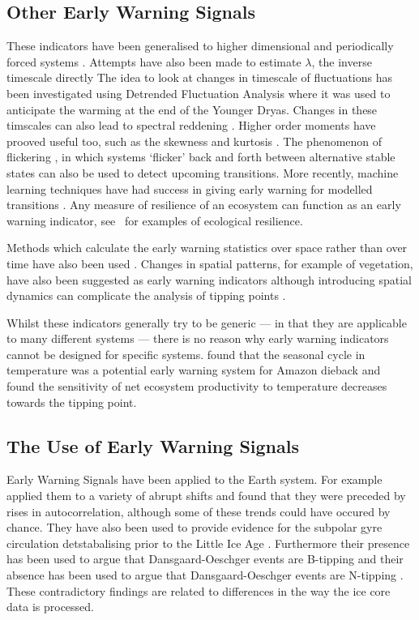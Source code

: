 \subsection{Other Early Warning Signals}
These indicators have been generalised to higher dimensional and periodically forced systems \parencite{Williamson2015,Williamson2016}. Attempts have also been made to estimate
$\lambda$, the inverse timescale directly \parencite{Boettner2022,Boers2021a} The idea to look at
changes in timescale of fluctuations has been investigated using Detrended Fluctuation Analysis \parencite{Livina2007} where it was used to anticipate the warming at the
end of the Younger Dryas. Changes in these timscales can also lead to spectral reddening \parencite{Kleinen2003}. Higher order moments have prooved useful too, such as the
skewness \parencite{Guttal2008} and kurtosis \parencite{Xie2019}. The phenomenon of flickering \parencite{Wang2012}, in which systems `flicker' back and forth between alternative stable
states can also be used to detect upcoming transitions. More recently, machine learning techniques have had success in giving early warning for modelled transitions \parencite{Bury2021}.
Any measure of resilience of an ecosystem can function as an early warning indicator, see~\cite{Krakovska2023} for examples of ecological resilience.


Methods which calculate the early warning statistics over space rather than over time have also been used \parencite{Donangelo2010,Guttal2009}. Changes in spatial
patterns, for example of vegetation, have also been suggested as early warning indicators \parencite{Kefi2007,Kefi2014} although introducing spatial dynamics can complicate the analysis
of tipping points \parencite{Rietkerk2021}.

Whilst these indicators generally try to be generic --- in that they are applicable to many different systems --- there is no reason why early warning indicators cannot be designed for specific systems.
\cite{Parry2022} found that the seasonal cycle in temperature was a potential early warning system for Amazon dieback and~\cite{Boulton2013} found the sensitivity of net ecosystem productivity to temperature decreases
towards the tipping point.

\subsection{The Use of Early Warning Signals}
Early Warning Signals have been applied to the Earth system. For example~\cite{Dakos2008} applied them to a variety of abrupt shifts and found that they were preceded by rises in autocorrelation,
although some of these trends could have occured by chance. They have also been used to provide evidence for the subpolar gyre circulation detstabalising prior to the
Little Ice Age \parencite{Arellano-Nava2022}. Furthermore their presence has been
used to argue that Dansgaard-Oeschger events are B-tipping \parencite{Boers2018a} and their absence has been used to argue that Dansgaard-Oeschger events are N-tipping \parencite{Ditlevsen2010}.
These contradictory findings
are related to differences in the way the ice core data is processed.

